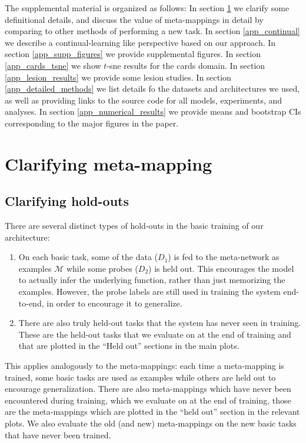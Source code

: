 \appendix
The supplemental material is organized as follows: In section \ref{app_clarifying_meta_mapping} we clarify some definitional details, and discuss the value of meta-mappings in detail by comparing to other methods of performing a new task. In section 
\ref{app_continual} we describe a continual-learning like perspective based on our approach. In section \ref{app_supp_figures} we provide supplemental figures. In section \ref{app_cards_tsne} we show $t$-sne results for the cards domain. In section \ref{app_lesion_results} we provide some lesion studies. In section \ref{app_detailed_methods} we list details fo the datasets and architectures we used, as well as providing links to the source code for all models, experiments, and analyses. In section \ref{app_numerical_results} we provide means and bootstrap CIs corresponding to the major figures in the paper. \par  

\section{Clarifying meta-mapping} \label{app_clarifying_meta_mapping}
\subsection{Clarifying hold-outs} \label{app_clarifying_holdouts}
There are several distinct types of hold-outs in the basic training of our architecture:
\begin{enumerate}
\item On each basic task, some of the data ($D_1$) is fed to the meta-network as examples $\mathcal{M}$ while some probes ($D_2$) is held out. This encourages the model to actually infer the underlying function, rather than just memorizing the examples. However, the probe labels are still used in training the system end-to-end, in order to encourage it to generalize.
\item There are also truly held-out tasks that the system has never seen in training. These are the held-out tasks that we evaluate on at the end of training and that are plotted in the ``Held out'' sections in the main plots.
\end{enumerate}
This applies analogously to the meta-mappings: each time a meta-mapping is trained, some basic tasks are used as examples while others are held out to encourage generalization. There are also meta-mappings which have never been encountered during training, which we evaluate on at the end of training, those are the meta-mappings which are plotted in the ``held out'' section in the relevant plots. We also evaluate the old (and new) meta-mappings on the new basic tasks that have never been trained. \par
